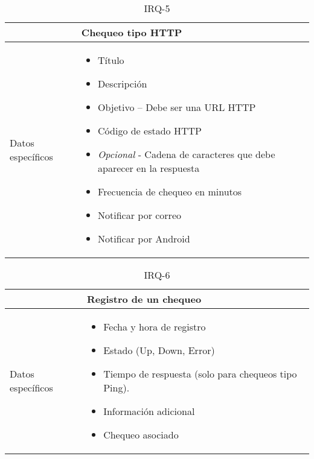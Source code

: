 \begin{table}[h!]
  \centering
  \begin{tabularx}{\textwidth}{|l|X|}
    \hline

    & Chequeo tipo HTTP \\

    \hline
    Datos específicos &

    \begin{itemize}
      \item Título 
      \item Descripción
      \item Objetivo -- Debe ser una \ac{URL} \ac{HTTP}
      \item Código de estado HTTP
      \item \textit{Opcional} - Cadena de caracteres que debe aparecer en la respuesta
      \item Frecuencia de chequeo en minutos
      \item Notificar por correo
      \item Notificar por Android
    \end{itemize}
    \\
    
    \hline
    
  \end{tabularx}
  \caption{IRQ-5}
\end{table}

\begin{table}[h!]
  \centering
  \begin{tabularx}{\textwidth}{|l|X|}
    \hline

    & Registro de un chequeo \\

    \hline
    Datos específicos &

    \begin{itemize}
    \item Fecha y hora de registro
    \item Estado (Up, Down, Error)
    \item Tiempo de respuesta (solo para chequeos tipo Ping).
    \item Información adicional
    \item Chequeo asociado
    \end{itemize}
    \\
    
    \hline
    
  \end{tabularx}
  \caption{IRQ-6}
\end{table}

